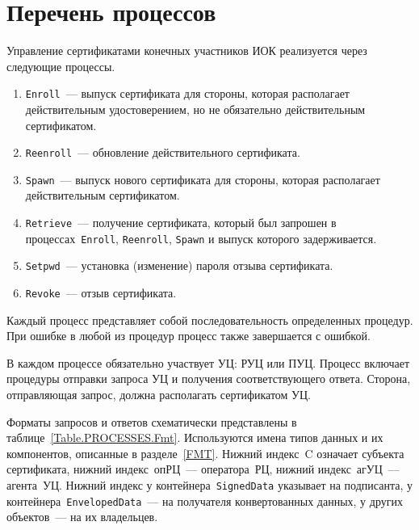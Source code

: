 \section{Перечень процессов}\label{PROCESSES.List}

Управление сертификатами конечных участников ИОК реализуется через 
следующие процессы. 

\begin{enumerate}
\item
\texttt{Enroll}~--- 
выпуск сертификата для стороны, которая располагает действительным
удостоверением, но не обязательно действительным сертификатом.
\item
\texttt{Reenroll}~--- 
обновление действительного сертификата.
\item
\texttt{Spawn}~--- 
выпуск нового сертификата для стороны, которая располагает действительным
сертификатом.
\item
\texttt{Retrieve}~--- 
получение сертификата, который был запрошен в процессах~\texttt{Enroll},
\texttt{Reenroll}, \texttt{Spawn} и выпуск которого задерживается.
\item
\texttt{Setpwd}~--- 
установка (изменение) пароля отзыва сертификата.
\item
\texttt{Revoke}~--- 
отзыв сертификата.
\end{enumerate}

Каждый процесс представляет собой последовательность определенных процедур. 
При ошибке в любой из процедур процесс также завершается с ошибкой.

В каждом процессе обязательно участвует УЦ: РУЦ или ПУЦ.
Процесс включает процедуры отправки запроса УЦ и получения 
соответствующего ответа. Сторона, отправляющая запрос, должна располагать 
сертификатом УЦ.

Форматы запросов и ответов схематически представлены 
в таблице~\ref{Table.PROCESSES.Fmt}. Используются имена типов данных и их 
компонентов, описанные в разделе~\ref{FMT}. Нижний индекс~C означает 
субъекта сертификата, нижний индекс~опРЦ~--- оператора~РЦ,
нижний индекс~агУЦ~--- агента~УЦ.
%
Нижний индекс у контейнера~\texttt{SignedData} указывает на подписанта,
у контейнера~\texttt{EnvelopedData}~--- на получателя конвертованных данных,
у других объектов~--- на их владельцев.

